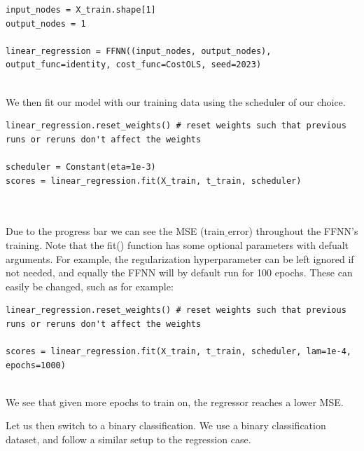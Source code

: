 \documentclass{beamer}
\begin{document}
\begin{frame}
\begin{verbatim}
input_nodes = X_train.shape[1]
output_nodes = 1

linear_regression = FFNN((input_nodes, output_nodes), output_func=identity, cost_func=CostOLS, seed=2023)


\end{verbatim}


We then fit our model with our training data using the scheduler of our choice.








\begin{verbatim}
linear_regression.reset_weights() # reset weights such that previous runs or reruns don't affect the weights

scheduler = Constant(eta=1e-3)
scores = linear_regression.fit(X_train, t_train, scheduler)



\end{verbatim}


Due to the progress bar we can see the MSE (train$\_$error) throughout
the FFNN's training. Note that the fit() function has some optional
parameters with defualt arguments. For example, the regularization
hyperparameter can be left ignored if not needed, and equally the FFNN
will by default run for 100 epochs. These can easily be changed, such
as for example:






\begin{verbatim}
linear_regression.reset_weights() # reset weights such that previous runs or reruns don't affect the weights

scores = linear_regression.fit(X_train, t_train, scheduler, lam=1e-4, epochs=1000)


\end{verbatim}


We see that given more epochs to train on, the regressor reaches a lower MSE.

Let us then switch to a binary classification. We use a binary
classification dataset, and follow a similar setup to the regression
case.



















\end{frame}
\end{document}
